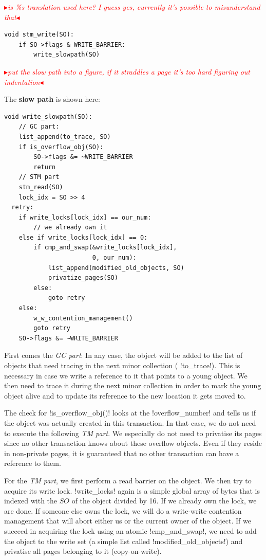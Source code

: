 \documentclass{sigplanconf}
\makeatletter
\renewcommand\lstinline[1][]{%
  \Collectverb{\@@myverb}%
}
\def\@@myverb#1{%
    \begingroup
    \fboxsep=0.2em
    \colorbox{verylightgray}{\oldlstinline|#1|}%
    \endgroup
}
\newcommand{\mynote}[2]{%
  \textcolor{red}{%
    \fbox{\bfseries\sffamily\scriptsize#1}%
    {\small$\blacktriangleright$\textsf{\emph{#2}}$\blacktriangleleft$}%
  }%
}
\newcommand\cfbolz[1]{\mynote{cfbolz}{#1}}
\makeatother
\begin{document}
\cfbolz{is \%s translation used here? I guess yes, currently it's possible to misunderstand that}

\begin{lstlisting}
void stm_write(SO):
	if SO->flags & WRITE_BARRIER:
		write_slowpath(SO)
\end{lstlisting}

\cfbolz{put the slow path into a figure, if it straddles a page it's too hard figuring out indentation}
The \textbf{slow path} is shown here:

\begin{lstlisting}
void write_slowpath(SO):
	// GC part:
	list_append(to_trace, SO)
	if is_overflow_obj(SO):
		SO->flags &= ~WRITE_BARRIER
		return
	// STM part
	stm_read(SO)
	lock_idx = SO >> 4
  retry:
	if write_locks[lock_idx] == our_num:
		// we already own it
	else if write_locks[lock_idx] == 0:
		if cmp_and_swap(&write_locks[lock_idx],
					    0, our_num):
			list_append(modified_old_objects, SO)
			privatize_pages(SO)
		else:
			goto retry
	else:
		w_w_contention_management()
		goto retry
	SO->flags &= ~WRITE_BARRIER
\end{lstlisting}


First comes the \emph{GC part}: In any case, the object will be added
to the list of objects that need tracing in the next minor collection
(\lstinline!to_trace!).  This is necessary in case we write a
reference to it that points to a young object. We then need to trace
it during the next minor collection in order to mark the young object
alive and to update its reference to the new location it gets moved
to.

The check for \lstinline!is_overflow_obj()! looks at the
\lstinline!overflow_number!  and tells us if the object was actually
created in this transaction. In that case, we do not need to execute
the following \emph{TM part}.  We especially do not need to privatise
its pages since no other transaction knows about these overflow
objects. Even if they reside in non-private pages, it is guaranteed
that no other transaction can have a reference to them.

For the \emph{TM part}, we first perform a read barrier on the
object. We then try to acquire its write lock. \lstinline!write_locks!
again is a simple global array of bytes that is indexed with the $SO$
of the object divided by 16. If we already own the lock, we are done.
If someone else owns the lock, we will do a write-write contention
management that will abort either us or the current owner of the
object.  If we succeed in acquiring the lock using an atomic
\lstinline!cmp_and_swap!, we need to add the object to the write set
(a simple list called \lstinline!modified_old_objects!)  and privatise
all pages belonging to it (copy-on-write).
\end{document}
